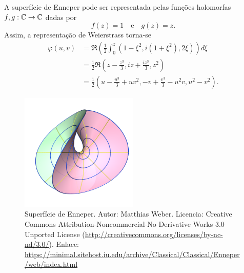 \begin{exemplo}
	A superfície de Enneper pode ser representada pelas funções holomorfas $f,g: \mathbb{C} \rightarrow \mathbb{C}$ dadas por
	\begin{equation*}
	f(z) = 1 \quad \text{e} \quad
	g(z) = z.
	\end{equation*}
	Assim, a representação de Weierstrass torna-se
	\begin{align*}
	\varphi(u,v) &= \Re \left( \frac{1}{2} \int_{0}^{z} \left( 1 - \xi^2, i (1 + \xi^2), 2\xi \right) \right) d\xi \\
	&= \frac{1}{2} \Re \left( z - \frac{z^3}{3}, iz + \frac{iz^3}{3}, z^2 \right) \\
	&= \frac{1}{2} \left( u - \frac{u^3}{3} + uv^2, -v + \frac{v^3}{3} - u^2v, u^2 - v^2 \right).
	\end{align*}
\end{exemplo}

\begin{figure}
	\centering
	\includegraphics[width=0.5\textwidth]{images/enneper}
	\caption{Superfície de Enneper. Autor: Matthias Weber. Licencia: Creative Commons Attribution-Noncommercial-No Derivative Works 3.0 Unported License (\url{http://creativecommons.org/licenses/by-nc-nd/3.0/}). Enlace: \url{https://minimal.sitehost.iu.edu/archive/Classical/Classical/Enneper/web/index.html}}
\end{figure}

